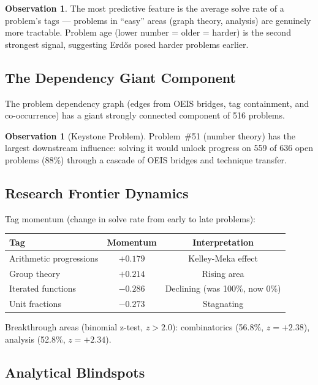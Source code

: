 \documentclass[11pt,a4paper]{article}
\theoremstyle{definition}
\newtheorem{observation}[theorem]{Observation}
\theoremstyle{remark}
\begin{document}
\begin{observation}
The most predictive feature is the average solve rate of a problem's tags
--- problems in ``easy'' areas (graph theory, analysis) are genuinely more
tractable. Problem age (lower number = older = harder) is the second strongest
signal, suggesting Erd\H{o}s posed harder problems earlier.
\end{observation}

\subsection{The Dependency Giant Component}

The problem dependency graph (edges from OEIS bridges, tag containment,
and co-occurrence) has a giant strongly connected component of 516 problems.

\begin{observation}[Keystone Problem]
Problem~\#51 (number theory) has the largest downstream influence: solving it
would unlock progress on 559 of 636 open problems (88\%) through a cascade
of OEIS bridges and technique transfer.
\end{observation}

\subsection{Research Frontier Dynamics}

Tag momentum (change in solve rate from early to late problems):

\begin{center}
\begin{tabular}{lcc}
\toprule
Tag & Momentum & Interpretation \\
\midrule
Arithmetic progressions & $+0.179$ & Kelley-Meka effect \\
Group theory & $+0.214$ & Rising area \\
Iterated functions & $-0.286$ & Declining (was 100\%, now 0\%) \\
Unit fractions & $-0.273$ & Stagnating \\
\bottomrule
\end{tabular}
\end{center}

Breakthrough areas (binomial z-test, $z > 2.0$): combinatorics (56.8\%, $z=+2.38$),
analysis (52.8\%, $z=+2.34$).

\subsection{Analytical Blindspots}
\end{document}
